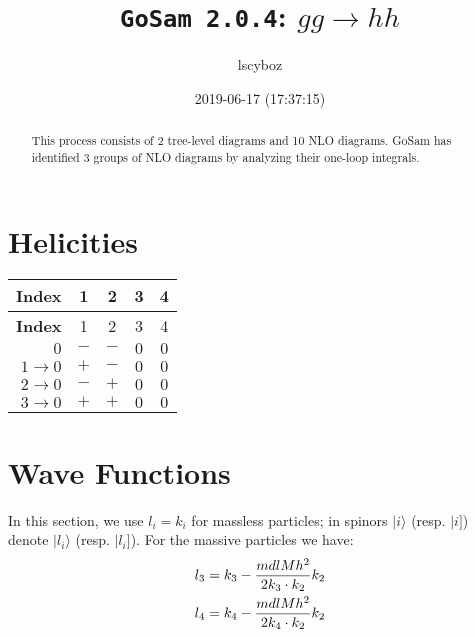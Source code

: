 \documentclass[a4paper]{article}
\title{\texttt{GoSam 2.0.4}: ${g}{g}\rightarrow{h}{h}$}
\author{lscyboz}
\date{2019-06-17 (17:37:15)}
\newcommand{\kea}[1]{\vert #1 \rangle}
\newcommand{\keb}[1]{\vert #1 ]}
\begin{document}
\maketitle
\begin{abstract}
\noindent This process consists of 2 tree-level diagrams and 10 NLO diagrams. GoSam has identified 3 groups  of NLO diagrams by analyzing their one-loop integrals.
\end{abstract}
\newpage
\tableofcontents
\newpage

\section{Helicities}

\begin{longtable}[c]{r|cccc}
\bf{Index} &1&2&3&4\\
\hline
\endfirsthead
\bf{Index} &1&2&3&4\\
\hline
\endhead 
$0$& $-$& $-$& $0$& $0$\\
$1\rightarrow 0$& $+$& $-$& $0$& $0$\\
$2\rightarrow 0$& $-$& $+$& $0$& $0$\\
$3\rightarrow 0$& $+$& $+$& $0$& $0$\\
\end{longtable}
\section{Wave Functions}
In this section, we use $l_i=k_i$ for massless particles;
in spinors $\kea{i}$ (resp. $\keb{i}$) denote $\kea{l_i}$ (resp. $\keb{l_i}$).
For the massive particles we have:
\begin{align}
l_{3} &= k_{3} - \frac{mdlMh^2}{%
      2 k_{3}\cdot k_{2}}k_{2}\\
l_{4} &= k_{4} - \frac{mdlMh^2}{%
      2 k_{4}\cdot k_{2}}k_{2}
\end{align}
\end{document}
